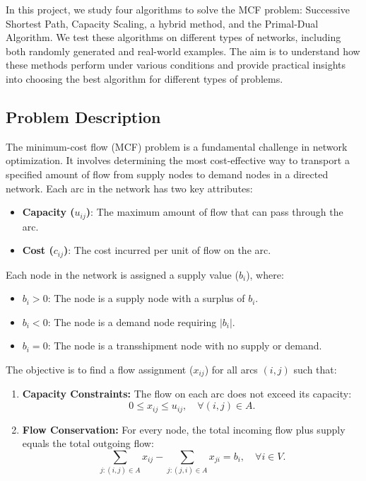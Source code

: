 \documentclass{article}
\begin{document}
In this project, we study four algorithms to solve the MCF problem: Successive Shortest Path, Capacity Scaling, a hybrid method, and the Primal-Dual Algorithm. We test these algorithms on different types of networks, including both randomly generated and real-world examples. The aim is to understand how these methods perform under various conditions and provide practical insights into choosing the best algorithm for different types of problems.

\subsection{Problem Description}
The minimum-cost flow (MCF) problem is a fundamental challenge in network optimization. It involves determining the most cost-effective way to transport a specified amount of flow from supply nodes to demand nodes in a directed network. Each arc in the network has two key attributes:
\begin{itemize}
    \item \textbf{Capacity (\(u_{ij}\))}: The maximum amount of flow that can pass through the arc.
    \item \textbf{Cost (\(c_{ij}\))}: The cost incurred per unit of flow on the arc.
\end{itemize}

Each node in the network is assigned a supply value (\(b_i\)), where:
\begin{itemize}
    \item \(b_i > 0\): The node is a supply node with a surplus of \(b_i\).
    \item \(b_i < 0\): The node is a demand node requiring \(|b_i|\).
    \item \(b_i = 0\): The node is a transshipment node with no supply or demand.
\end{itemize}

The objective is to find a flow assignment (\(x_{ij}\)) for all arcs \((i, j)\) such that:
\begin{enumerate}
    \item \textbf{Capacity Constraints:} The flow on each arc does not exceed its capacity:
    \[
    0 \leq x_{ij} \leq u_{ij}, \quad \forall (i, j) \in A.
    \]
    \item \textbf{Flow Conservation:} For every node, the total incoming flow plus supply equals the total outgoing flow:
    \[
    \sum_{j:(i,j) \in A} x_{ij} - \sum_{j:(j,i) \in A} x_{ji} = b_i, \quad \forall i \in V.
    \]
\end{enumerate}
\end{document}
